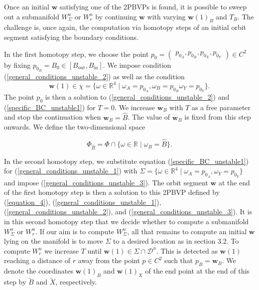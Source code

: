 \documentclass{ws-ijbc}
\begin{document}
Once an initial $\mathbf{w}$ satisfying one of the 2PBVPs  is found, it is possible to sweep out a submanifold $W^u_\Sigma$ or $W^u_r$ by continuing $\mathbf{w}$ with varying $\mathbf{w}(1)_B$ and $T_B$.  The challenge is, once again, the computation via homotopy steps of an initial orbit segment satisfying the boundary conditions.

In the first homotopy step, we choose the point $p_0=\begin{pmatrix} p_{0_A}, p_{0_B}, p_{0_X}, p_{0_Y} \end{pmatrix} \in C^2$ by fixing $p_{0_B}=B_0 \in [B_{\text{out}}, B_{\text{in}}]$.  We impose condition (\ref{general_conditions_unstable_2}) as well as the condition
	\begin{equation}
		\mathbf{w}(1) \in \chi = \{ \omega \in \mathbb{R}^4 \; | \; \omega_A=p_{0_A}, \omega_B=p_{0_B} \omega_Y=p_{0_Y} \}.
		\label{specific_BC_unstable1}
	\end{equation}
The point $p_0$ is then a solution to (\ref{general_conditions_unstable_2}) and (\ref{specific_BC_unstable1}) for $T=0$.  We increase $\mathbf{w}_B$ with $T$ as a free parameter and stop the continuation when $\mathbf{w}_B=\widehat{B}$.  The value of $\mathbf{w}_B$ is fixed from this step onwards.  We define the two-dimensional space

\begin{equation*}
	\Phi_{\widehat{B}} = \Phi \cap \{ \omega \in \mathbb{R} \; | \; \omega_B=\widehat{B}\}.
\end{equation*}

In the second homotopy step, we substitute equation (\ref{specific_BC_unstable1}) for (\ref{general_conditions_unstable_1}) with $\Sigma=\{ \omega \in \mathbb{R}^4 \;|\; \omega_A=p_{0_A}, \omega_Y=p_{0_Y} \}$ and impose (\ref{general_conditions_unstable_3}).  The orbit segment $\mathbf{w}$ at the end of the first homotopy step is then a solution to this 2PBVP defined by (\ref{equation_4}), (\ref{general_conditions_unstable_1}), (\ref{general_conditions_unstable_2}), and (\ref{general_conditions_unstable_3}).  It is in this second homotopy step that we decide whether to compute a submanifold $W^u_\Sigma$ or $W^u_r$.  If our aim is to compute $W^u_\Sigma$, all that remains to compute an initial $\mathbf{w}$ lying on the manifold is to move $\Sigma$ to a desired location as in section 3.2.  To compute $W^u_r$ we increase $T$ until $\mathbf{w}(1) \in \Sigma \cap \mathscr{D}^u$.  This is detected as $\mathbf{w}(1)$ reaching a distance of $r$ away from the point $p \in C^2$ such that $p_B = \mathbf{w}_B$.  We denote the coordinates $\mathbf{w}(1)_B$ and $\mathbf{w}(1)_X$ of the end point at the end of this step by $\widetilde{B}$ and $\widetilde{X}$, respectively.  
\end{document}
